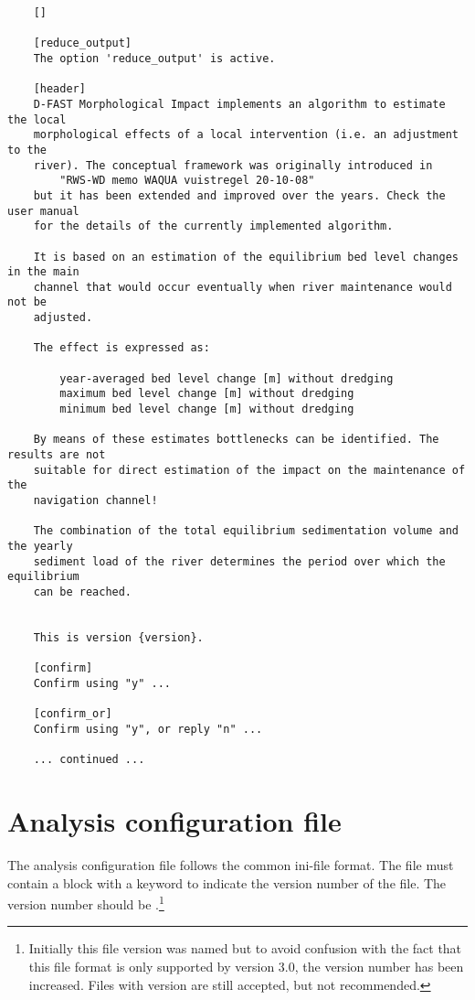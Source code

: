 \begin{Verbatim}
    []
    
    [reduce_output]
    The option 'reduce_output' is active.
    
    [header]
    D-FAST Morphological Impact implements an algorithm to estimate the local
    morphological effects of a local intervention (i.e. an adjustment to the
    river). The conceptual framework was originally introduced in
        "RWS-WD memo WAQUA vuistregel 20-10-08"
    but it has been extended and improved over the years. Check the user manual
    for the details of the currently implemented algorithm.
    
    It is based on an estimation of the equilibrium bed level changes in the main
    channel that would occur eventually when river maintenance would not be
    adjusted.
    
    The effect is expressed as:
    
        year-averaged bed level change [m] without dredging
        maximum bed level change [m] without dredging
        minimum bed level change [m] without dredging
    
    By means of these estimates bottlenecks can be identified. The results are not
    suitable for direct estimation of the impact on the maintenance of the
    navigation channel!
    
    The combination of the total equilibrium sedimentation volume and the yearly
    sediment load of the river determines the period over which the equilibrium
    can be reached.
    
    
    This is version {version}.
    
    [confirm]
    Confirm using "y" ...
    
    [confirm_or]
    Confirm using "y", or reply "n" ...
    
    ... continued ...
\end{Verbatim}

\section{Analysis configuration file}\label{app:config}

The analysis configuration file follows the common ini-file format.
The file must contain a \keyw{[General]} block with a keyword  to indicate the version number of the file.
The version number should be .\footnote{Initially this file version was named  but to avoid confusion with the fact that this file format is only supported by \dfastmi version 3.0, the version number has been increased.
Files with version  are still accepted, but not recommended.}

